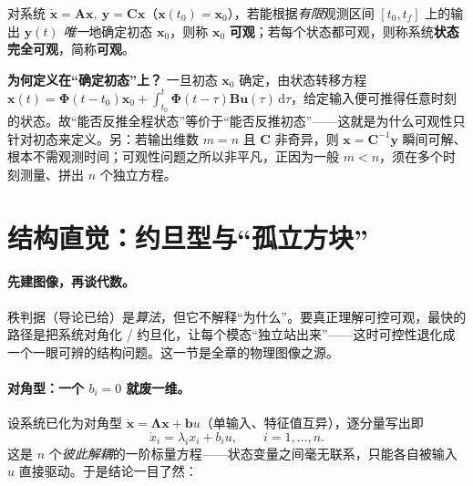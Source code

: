 \begin{definition}\label{def:co-observable}
对系统 $\dot{\mathbf{x}}=\mathbf{A}\mathbf{x},\ \mathbf{y}=\mathbf{C}\mathbf{x}$（$\mathbf{x}(t_0)=\mathbf{x}_0$），若能根据\emph{有限}观测区间 $[t_0,t_f]$ 上的输出 $\mathbf{y}(t)$ \emph{唯一}地确定初态 $\mathbf{x}_0$，则称 $\mathbf{x}_0$ \textbf{可观}；若每个状态都可观，则称系统\textbf{状态完全可观}，简称\textbf{可观}\cite{liubao2006modern}。
\end{definition}

\begin{note}
\textbf{为何定义在“确定初态”上？}\;
一旦初态 $\mathbf{x}_0$ 确定，由状态转移方程 $\mathbf{x}(t)=\boldsymbol{\Phi}(t-t_0)\mathbf{x}_0+\int_{t_0}^t\boldsymbol{\Phi}(t-\tau)\mathbf{B}\mathbf{u}(\tau)\,\mathrm d\tau$，给定输入便可推得任意时刻的状态。故“能否反推全程状态”等价于“能否反推初态”——这就是为什么可观性只针对初态来定义\cite{liubao2006modern}。另：若输出维数 $m=n$ 且 $\mathbf{C}$ 非奇异，则 $\mathbf{x}=\mathbf{C}^{-1}\mathbf{y}$ 瞬间可解、根本不需观测时间；可观性问题之所以非平凡，正因为一般 $m<n$，须在多个时刻测量、拼出 $n$ 个独立方程。
\end{note}

\section{结构直觉：约旦型与“孤立方块”}
\label{sec:co-jordan}

\paragraph{先建图像，再谈代数。}
秩判据（导论已给）是\emph{算法}，但它不解释“为什么”。要真正理解可控可观，最快的路径是把系统对角化 / 约旦化，让每个模态“独立站出来”——这时可控性退化成一个一眼可辨的结构问题。这一节是全章的物理图像之源。

\paragraph{对角型：一个 $b_i=0$ 就废一维。}
设系统已化为对角型 $\dot{\mathbf{x}}=\boldsymbol{\Lambda}\mathbf{x}+\mathbf{b}u$（单输入、特征值互异），逐分量写出即
\begin{equation}
  \dot{x}_i=\lambda_i x_i+b_i u,\qquad i=1,\dots,n.
  \label{eq:co-diag-scalar}
\end{equation}
这是 $n$ 个\emph{彼此解耦}的一阶标量方程——状态变量之间毫无联系，只能各自被输入 $u$ 直接驱动。于是结论一目了然\cite{liubao2006modern}：

